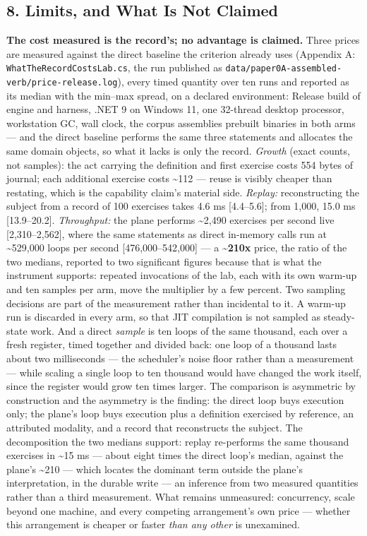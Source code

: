 \documentclass[
]{article}
\begin{document}
\subsection{8. Limits, and What Is Not
Claimed}\label{limits-and-what-is-not-claimed}

\textbf{The cost measured is the record's; no advantage is claimed.}
Three prices are measured against the direct baseline the criterion
already uses (Appendix A: \texttt{WhatTheRecordCostsLab.cs}, the run
published as \texttt{data/paper0A-assembled-verb/price-release.log}),
every timed quantity over ten runs and reported as its median with the
min--max spread, on a declared environment: Release build of engine and
harness, .NET 9 on Windows 11, one 32-thread desktop processor,
workstation GC, wall clock, the corpus assemblies prebuilt binaries in
both arms --- and the direct baseline performs the same three statements
and allocates the same domain objects, so what it lacks is only the
record. \emph{Growth} (exact counts, not samples): the act carrying the
definition and first exercise costs 554 bytes of journal; each
additional exercise costs \textasciitilde112 --- reuse is visibly
cheaper than restating, which is the capability claim's material side.
\emph{Replay:} reconstructing the subject from a record of 100 exercises
takes 4.6 ms {[}4.4--5.6{]}; from 1,000, 15.0 ms {[}13.9--20.2{]}.
\emph{Throughput:} the plane performs \textasciitilde2,490 exercises per
second live {[}2,310--2,562{]}, where the same statements as direct
in-memory calls run at \textasciitilde529,000 loops per second
{[}476,000--542,000{]} --- a \textbf{\textasciitilde210x} price, the
ratio of the two medians, reported to two significant figures because
that is what the instrument supports: repeated invocations of the lab,
each with its own warm-up and ten samples per arm, move the multiplier
by a few percent. Two sampling decisions are part of the measurement
rather than incidental to it. A warm-up run is discarded in every arm,
so that JIT compilation is not sampled as steady-state work. And a
direct \emph{sample} is ten loops of the same thousand, each over a
fresh register, timed together and divided back: one loop of a thousand
lasts about two milliseconds --- the scheduler's noise floor rather than
a measurement --- while scaling a single loop to ten thousand would have
changed the work itself, since the register would grow ten times larger.
The comparison is asymmetric by construction and the asymmetry is the
finding: the direct loop buys execution only; the plane's loop buys
execution plus a definition exercised by reference, an attributed
modality, and a record that reconstructs the subject. The decomposition
the two medians support: replay re-performs the same thousand exercises
in \textasciitilde15 ms --- about eight times the direct loop's median,
against the plane's \textasciitilde210 --- which locates the dominant
term outside the plane's interpretation, in the durable write --- an
inference from two measured quantities rather than a third measurement.
What remains unmeasured: concurrency, scale beyond one machine, and
every competing arrangement's own price --- whether this arrangement is
cheaper or faster \emph{than any other} is unexamined.
\end{document}
